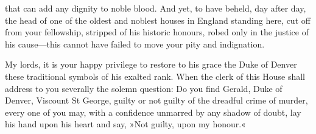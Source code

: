 \begin{dialogue}
that can add any dignity to noble blood. And yet, to have beheld, day after day, the head of one of the oldest and noblest houses in England standing here, cut off from your fellowship, stripped of his historic honours, robed only in the justice of his cause\allowbreak---\allowbreak this cannot have failed to move your pity and indignation.

\smallskip

My lords, it is your happy privilege to restore to his grace the Duke of Denver these traditional symbols of his exalted rank. When the clerk of this House shall address to you severally the solemn question: Do you find Gerald, Duke of Denver, Viscount St George, guilty or not guilty of the dreadful crime of murder, every one of you may, with a confidence unmarred by any shadow of doubt, lay his hand upon his heart and say, »Not guilty, upon my honour.«

\end{dialogue}
